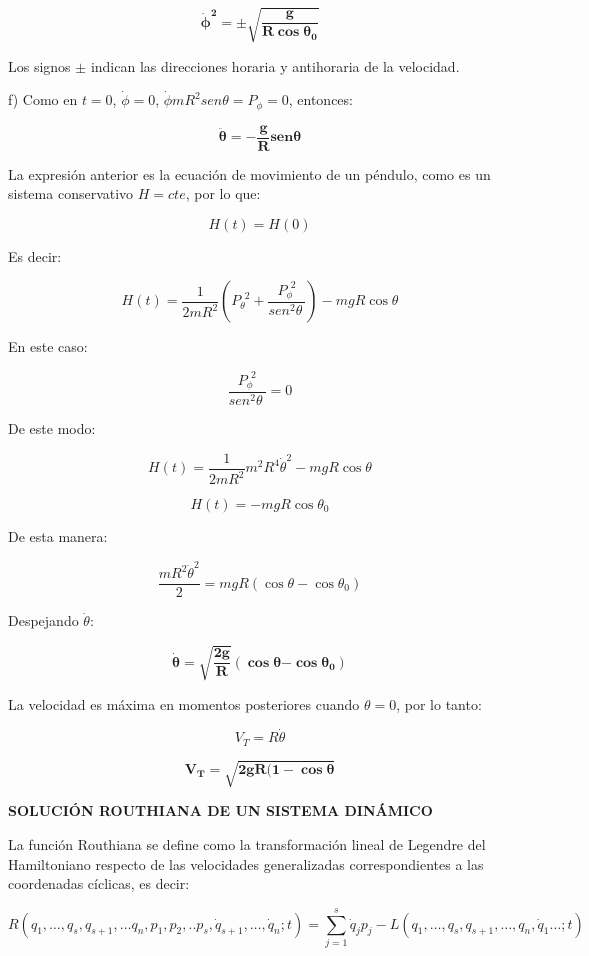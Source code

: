 \documentclass[]{article}
\begin{document}
\[{\dot{\mathbf{\phi}}}^{\mathbf{2}}\mathbf{= \pm}\sqrt{\frac{\mathbf{g}}{\mathbf{R}\mathbf{\cos}\mathbf{\theta}_{\mathbf{0}}}}\]

Los signos \(\pm\) indican las direcciones horaria y antihoraria de la
velocidad.

f) Como en \(t = 0\), \(\dot{\phi} = 0\),
\(\dot{\phi}mR^{2}{sen}\theta = P_{\phi} = 0\), entonces:

\[\ddot{\mathbf{\theta}}\mathbf{= -}\frac{\mathbf{g}}{\mathbf{R}}\mathbf{sen}\mathbf{\theta}\]

La expresión anterior es la ecuación de movimiento de un péndulo, como
es un sistema conservativo \(H = cte\), por lo que:

\[H(t) = H(0)\]

Es decir:

\[H(t) = \frac{1}{2mR^{2}}\left( P_{\theta}^{\ \ 2} + \frac{P_{\phi}^{\ \ 2}}{{sen}^{2}\theta\ } \right) - mgR\cos\theta\]

En este caso:

\[\frac{P_{\phi}^{\ \ 2}}{{sen}^{2}\theta\ } = 0\]

De este modo:

\[H(t) = \frac{1}{2mR^{2}}m^{2}R^{4}{\dot{\theta}}^{2} - mgR\cos\theta\]

\[H(t) = - mgR{\cos\theta}_{0}\]

De esta manera:

\[\frac{mR^{2}{\dot{\theta}}^{2}}{2} = mgR\left( \cos\theta - {\cos\theta}_{0} \right)\]

Despejando \(\dot{\theta}:\)

\[\dot{\mathbf{\theta}}\mathbf{=}\sqrt{\frac{\mathbf{2}\mathbf{g}}{\mathbf{R}}}\left( \mathbf{\cos}\mathbf{\theta}\mathbf{-}{\mathbf{\cos}\mathbf{\theta}}_{\mathbf{0}} \right)\]

La velocidad es máxima en momentos posteriores cuando \(\theta = 0\),
por lo tanto:

\[V_{T} = R\dot{\theta}\]

\[\mathbf{V}_{\mathbf{T}}\mathbf{=}\sqrt{\mathbf{2}\mathbf{gR(1 -}\mathbf{\cos}\mathbf{\theta}}\]

\textbf{SOLUCIÓN ROUTHIANA DE UN SISTEMA DINÁMICO}

La función Routhiana se define como la transformación lineal de Legendre
del Hamiltoniano respecto de las velocidades generalizadas
correspondientes a las coordenadas cíclicas, es decir:

\[R\left( q_{1},\ldots,q_{s},q_{s + 1},\ldots q_{n},p_{1},p_{2},{..p}_{s},{\dot{q}}_{s + 1},\ldots,{\dot{q}}_{n};t \right) = \sum_{j = 1}^{s}{\dot{q}}_{j}p_{j} - L\left( q_{1},\ldots,q_{s},q_{s + 1},\ldots,q_{n},{\dot{q}}_{1}\ldots;t \right)\ \ \ \ \ \ \ \ \ \ \ \]
\end{document}

